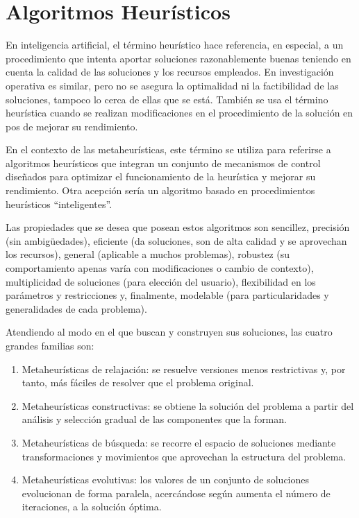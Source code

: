 \section{Algoritmos Heurísticos}
En inteligencia artificial, el término heurístico hace referencia, en especial, a un procedimiento que intenta aportar soluciones razonablemente buenas teniendo en cuenta la calidad de las soluciones y los recursos empleados. En investigación operativa es similar, pero no se asegura la optimalidad ni la factibilidad de las soluciones, tampoco lo cerca de ellas que se está. También se usa el término heurística cuando se realizan modificaciones en el procedimiento de la solución en pos de mejorar su rendimiento.

En el contexto de las metaheurísticas, este término se utiliza para referirse a algoritmos heurísticos que integran un conjunto de mecanismos de control diseñados para optimizar el funcionamiento de la heurística y mejorar su rendimiento. Otra acepción sería un algoritmo basado en procedimientos
heurísticos “inteligentes”.

Las propiedades que se desea que posean estos algoritmos son sencillez, precisión (sin ambigüedades), eficiente (da soluciones, son de alta calidad y se aprovechan los recursos), general (aplicable a muchos problemas), robustez (su comportamiento apenas varía con modificaciones o cambio de contexto), multiplicidad de soluciones (para elección del usuario), flexibilidad en los parámetros y restricciones y, finalmente, modelable (para particularidades y generalidades de cada problema). 

Atendiendo al modo en el que buscan y construyen sus soluciones, las cuatro grandes familias son:
\begin{enumerate}
    \item Metaheurísticas de relajación:  se resuelve versiones menos restrictivas y, por tanto, más fáciles de resolver que el problema original.
    \item Metaheurísticas constructivas: se obtiene la solución del problema a partir del análisis y selección gradual de las componentes que la forman.
    \item Metaheurísticas de búsqueda: se recorre el espacio de soluciones mediante transformaciones y movimientos que aprovechan la estructura del problema.
    \item Metaheurísticas evolutivas: los valores de un conjunto de soluciones evolucionan de forma paralela, acercándose según aumenta el número de iteraciones, a la solución óptima.
\end{enumerate}

